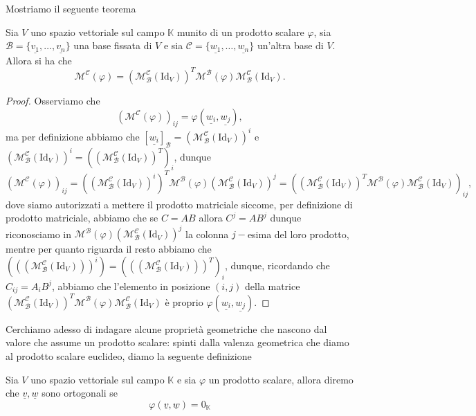Mostriamo il seguente teorema
\begin{theorem}
	Sia $V$ uno spazio vettoriale sul campo $\mathbb{K}$ munito di un prodotto scalare $\varphi$, sia $\mathcal{B} = \{ \underline{v_1}, \ldots, \underline{v_n} \}$ una base fissata di $V$ e sia $\mathcal{C} = \{ \underline{w_1}, \ldots, \underline{w_n} \}$ un'altra base di $V$. Allora si ha che
	$$
		\mathcal{M}^\mathcal{C}(\varphi) = (\mathcal{M}^\mathcal{C}_\mathcal{B}(\text{Id}_V))^T \mathcal{M}^\mathcal{B}(\varphi) \mathcal{M}^\mathcal{C}_\mathcal{B}(\text{Id}_V).
	$$
\end{theorem}
\begin{proof}
	Osserviamo che
	$$
		(\mathcal{M}^\mathcal{C}(\varphi))_{ij} = \varphi(\underline{w_i}, \underline{w_j}),
	$$     
	ma per definizione abbiamo che $[\underline{w_i}]_\mathcal{B} = (\mathcal{M}^{\mathcal{C}}_\mathcal{B}(\text{Id}_V))^i$ e $(\mathcal{M}^{\mathcal{C}}_{\mathcal{B}}(\text{Id}_V))^i = ((\mathcal{M}^{\mathcal{C}}_{\mathcal{B}}(\text{Id}_V))^T)_i$, dunque
	$$
		(\mathcal{M}^\mathcal{C}(\varphi))_{ij} = ((\mathcal{M}^{\mathcal{C}}_{\mathcal{B}}(\text{Id}_V))^i)^T \mathcal{M}^\mathcal{B}(\varphi) (\mathcal{M}^{\mathcal{C}}_{\mathcal{B}}(\text{Id}_V))^j = ((\mathcal{M}^{\mathcal{C}}_{\mathcal{B}}(\text{Id}_V))^T \mathcal{M}^\mathcal{B}(\varphi) \mathcal{M}^{\mathcal{C}}_{\mathcal{B}}(\text{Id}_V))_{ij},  
	$$
	dove siamo autorizzati a mettere il prodotto matriciale siccome, per definizione di prodotto matriciale, abbiamo che se $C = AB$ allora $C^j = AB^j$ dunque riconosciamo in $\mathcal{M}^\mathcal{B}(\varphi) (\mathcal{M}^{\mathcal{C}}_{\mathcal{B}}(\text{Id}_V))^j$ la colonna $j-$esima del loro prodotto, mentre per quanto riguarda il resto abbiamo che $(((\mathcal{M}^{\mathcal{C}}_{\mathcal{B}}(\text{Id}_V)))^i) = (((\mathcal{M}^{\mathcal{C}}_{\mathcal{B}}(\text{Id}_V)))^T)_i$, dunque, ricordando che $C_{ij} = A_i B^j$, abbiamo che l'elemento
	in posizione $(i, j)$ della matrice $(\mathcal{M}^\mathcal{C}_\mathcal{B}(\text{Id}_V))^T \mathcal{M}^\mathcal{B}(\varphi) \mathcal{M}^\mathcal{C}_\mathcal{B}(\text{Id}_V)$ è proprio $\varphi(\underline{w_i}, \underline{w_j})$.
\end{proof}

Cerchiamo adesso di indagare alcune proprietà geometriche che nascono dal valore che assume un prodotto scalare: spinti dalla valenza geometrica che diamo al prodotto scalare euclideo, diamo la seguente definizione

\begin{definition}
	Sia $V$ uno spazio vettoriale sul campo $\mathbb{K}$ e sia $\varphi$ un prodotto scalare, allora diremo che $\underline{v}, \underline{w}$ sono ortogonali se
	$$
		\varphi(\underline{v}, \underline{w}) = 0_\mathbb{K}
	$$
\end{definition}

